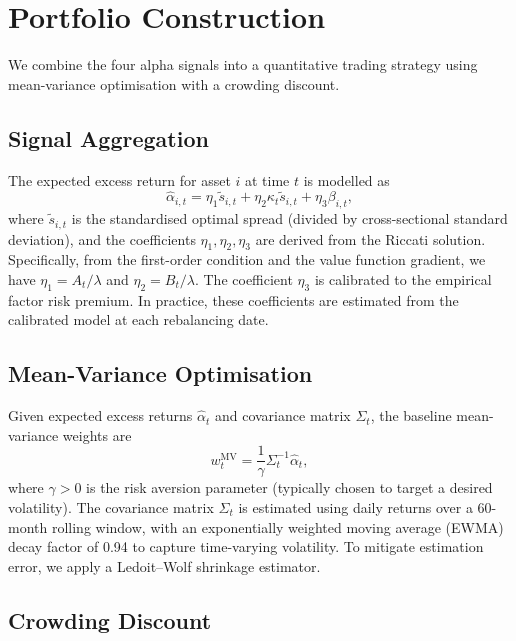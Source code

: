 \section{Portfolio Construction}
\label{sec:alpha-portfolio}

We combine the four alpha signals into a quantitative trading strategy using
mean-variance optimisation with a crowding discount.

\subsection{Signal Aggregation}

The expected excess return for asset $i$ at time $t$ is modelled as
\begin{equation}
    \hat\alpha_{i,t} = \eta_1 \tilde{s}_{i,t} + \eta_2 \kappa_t \tilde{s}_{i,t} +
    \eta_3 \beta_{i,t},
    \label{eq:alpha-signal-aggregation}
\end{equation}
where $\tilde{s}_{i,t}$ is the standardised optimal spread (divided by
cross-sectional standard deviation), and the coefficients $\eta_1, \eta_2, \eta_3$
are derived from the Riccati solution. Specifically, from the first-order condition
and the value function gradient, we have $\eta_1 = A_t/\lambda$ and
$\eta_2 = B_t/\lambda$. The coefficient $\eta_3$ is calibrated to the empirical
factor risk premium. In practice, these coefficients are estimated from the
calibrated model at each rebalancing date.

\subsection{Mean-Variance Optimisation}

Given expected excess returns $\hat\alpha_t$ and covariance matrix $\Sigma_t$, the
baseline mean-variance weights are
\begin{equation}
    w_t^{\mathrm{MV}} = \frac{1}{\gamma} \Sigma_t^{-1} \hat\alpha_t,
    \label{eq:alpha-mv-weights}
\end{equation}
where $\gamma > 0$ is the risk aversion parameter (typically chosen to target a
desired volatility). The covariance matrix $\Sigma_t$ is estimated using daily
returns over a 60-month rolling window, with an exponentially weighted moving
average (EWMA) decay factor of 0.94 to capture time-varying volatility. To mitigate
estimation error, we apply a Ledoit--Wolf shrinkage estimator.

\subsection{Crowding Discount}

